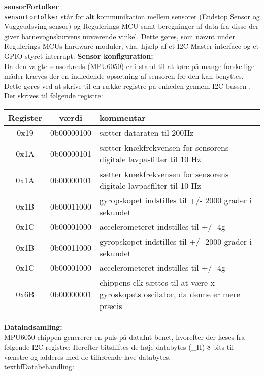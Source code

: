\label{vugsys:impl, sensFortolk}\textbf{sensorFortolker}  \\
\verb+sensorFortolker+ står for alt kommunikation mellem sensorer (Endstop Sensor og Vuggeudsving sensor) og Regulerings MCU samt beregninger af data fra disse der giver barnevognskurvens nuværende vinkel. Dette gøres, som nævnt under Regulerings MCUs hardware moduler, vha. hjælp af et I2C Master interface og et GPIO styret interrupt. 
\textbf{Sensor konfiguration:} \\
Da den valgte sensorkreds (MPU6050) er i stand til at køre på mange forskellige måder kræves der en indledende opsætning af sensoren før den kan benyttes. Dette gøres ved at skrive til en række registre på enheden gennem I2C bussen \citep{I2C}. Der skrives til følgende registre:
\begin{center}
    \begin{tabular}{| c | c | p{8cm} |}
    \hline
    \textbf{Register}	& \textbf{værdi} & \textbf{kommentar} \\ \hline
    0x19 & 0b00000100 & sætter dataraten til 200Hz \\
    0x1A & 0b00000101 & sætter knækfrekvensen for sensorens digitale lavpasfilter til 10 Hz \\
    0x1A & 0b00000101 & sætter knækfrekvensen for sensorens digitale lavpasfilter til 10 Hz \\
    0x1B & 0b00011000 & gyropskopet indstilles til +/- 2000 grader i sekundet  \\
    0x1C & 0b00001000 & accelerometeret indstilles til +/- 4g \\
    0x1B & 0b00011000 & gyropskopet indstilles til +/- 2000 grader i sekundet  \\
    0x1C & 0b00001000 & accelerometeret indstilles til +/- 4g \\
    0x6B & 0b00000001 & chippens clk sættes til at være x gyroskopets oscilator, da denne er mere præcis \\ \hline
    \end{tabular}
\end{center}
\textbf{Dataindsamling:} \\
MPU6050 chippen genererer en puls på dataInt benet, hvorefter der læses fra følgende I2C registre:
Herefter bitshiftes de høje databytes (\_H) 8 bits til vænstre og adderes med de tilhørende lave databytes.\\
textbf{Databehandling:} \\

